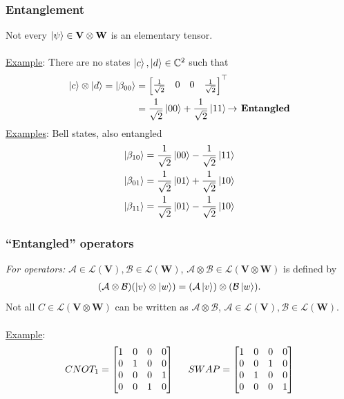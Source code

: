 \documentclass{beamer}
\theoremstyle{definition}
\newcommand{\V}{\mathbf{V}}
\newcommand{\W}{\mathbf{W}}
\newcommand{\A}{\mathcal{A}}
\newcommand{\B}{\mathcal{B}}
\newcommand{\lag}{\mathcal{L}}
\begin{document}
\begin{frame}
\frametitle{Entanglement}
Not every $\ket{\psi} \in \V\otimes \W$ is an elementary tensor. \\
$\,$\\
\underline{Example}: There are no states $\left\vert{c}\right\rangle, \left\vert{d}\right\rangle \in \mathbb{C}^2$ such that
\begin{align*}
\left\vert{c}\right\rangle \otimes \left\vert{d}\right\rangle = \left\vert{\beta_{00}}\right\rangle &= \begin{bmatrix}
\frac{1}{\sqrt{2}} & 0 & 0 & \frac{1}{\sqrt{2}}
\end{bmatrix}^\top \\
&= \frac{1}{\sqrt{2}}\left\vert{00}\right\rangle + \frac{1}{\sqrt{2}}\left\vert{11}\right\rangle \textbf{$\rightarrow$ Entangled}
\end{align*}
\underline{Examples}: Bell states, also entangled \cite{Bell}
\begin{align*}
\left\vert{\beta_{10}}\right\rangle = \frac{1}{\sqrt{2}}\left\vert{00}\right\rangle - \frac{1}{\sqrt{2}}\left\vert{11}\right\rangle\\
\left\vert{\beta_{01}}\right\rangle = \frac{1}{\sqrt{2}}\left\vert{01}\right\rangle + \frac{1}{\sqrt{2}}\left\vert{10}\right\rangle\\
\left\vert{\beta_{11}}\right\rangle = \frac{1}{\sqrt{2}}\left\vert{01}\right\rangle - \frac{1}{\sqrt{2}}\left\vert{10}\right\rangle\\
\end{align*}


\end{frame}

\begin{frame}
\frametitle{``Entangled'' operators}
\textit{For operators:} $\A \in \mathfrak{\lag}(\V), \mathcal{B} \in \mathfrak{\lag}(\W)$, $\A\otimes \B \in \mathfrak{\lag}(\V \otimes \W)$ is defined by
\begin{align*}
(\A \otimes \B)(\ket{v}\otimes \ket{w}) = (\A\ket{v})\otimes (\B\ket{w}).
\end{align*}
Not all $C \in \mathfrak{\lag}(\V\otimes \W)$ can be written as $\A \otimes \B$, $\A \in \mathfrak{\lag}(\V), \mathcal{B} \in \mathfrak{\lag}(\W)$.\\
$\,$\\
\underline{Example}:
\begin{align*}
CNOT_1 = \begin{bmatrix}
1&0&0&0\\
0&1&0&0\\
0&0&0&1\\
0&0&1&0
\end{bmatrix} 
\hspace{0.5cm}
SWAP = 
\begin{bmatrix}
1&0&0&0\\
0&0&1&0\\
0&1&0&0\\
0&0&0&1
\end{bmatrix} 
\end{align*}
\end{frame}
\end{document}
